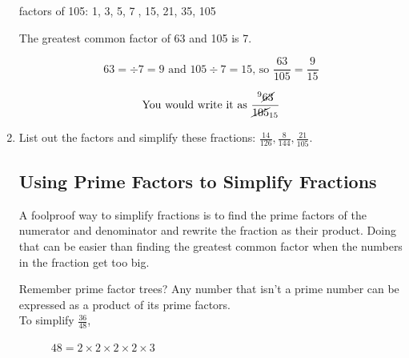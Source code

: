 \documentclass[14pt]{article}
\begin{document}
\begin{enumerate}
factors of 105: 1, 3, 5, \textcircled{7,} 15, 21, 35, 105

\vspace{28pt}
The greatest common factor of 63 and 105 is 7.

$$63 = \div 7 = 9 \text{ and }105 \div 7 = 15\text{, so }\frac{63}{105} = \frac{9}{15}$$

$$\text{You would write it as }\frac{^9 \cancel{63}}{\cancel{105}_{15}}$$

\vspace{28pt}
\item List out the factors and simplify these fractions: $\frac{14}{126}, \frac{8}{144}, \frac{21}{105}$.

\subsection*{Using Prime Factors to Simplify Fractions}
A foolproof way to simplify fractions is to find the prime factors of the numerator and denominator and rewrite the fraction as their product. Doing that can be easier than finding the greatest common factor when the numbers in the fraction get too big.

Remember prime factor trees? Any number that isn't a prime number can be expressed as a product of its prime factors.\\

To simplify $\frac{36}{48}$,
\begin{figure}[ht]
  \centering
  \begin{minipage}{0.4\textwidth}
    \centering
\caption*{\hspace{1cm}$36 = 2 \times 2 \times 3 \times 3$}
    \label{fig:tree36}
  \end{minipage}%
  \hfill
  \begin{minipage}{0.4\textwidth}
    \centering
    \caption*{\hspace{1cm}$48 = 2 \times 2 \times2 \times 2 \times 3$}
    \label{fig:tree48}
  \end{minipage}
\end{figure}


\end{enumerate}
\end{document}
